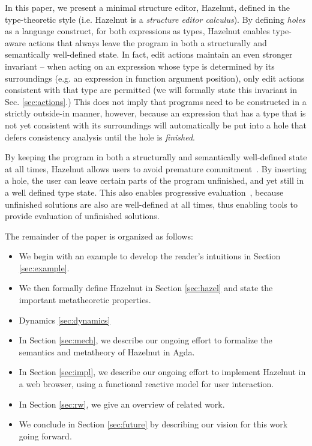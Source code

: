 In this paper, we present a minimal structure editor, Hazelnut,  defined in the type-theoretic style (i.e. Hazelnut is a \emph{structure editor calculus}). 
By defining \emph{holes} as a language construct, for both expressions as types, Hazelnut enables type-aware actions that always leave the program in both a structurally and semantically well-defined state. 
In fact, edit actions maintain an even stronger invariant -- when acting on an expression whose type is determined by its surroundings (e.g. an expression in function argument position), only edit actions consistent with that type are permitted (we will formally state this invariant in Sec. \ref{sec:actions}.) This does not imply that programs need to be constructed in a strictly outside-in manner, however, because an expression that has a type that is not yet consistent with its surroundings will automatically be put into a {hole} that defers consistency analysis until the hole is \emph{finished}.

By keeping the program in both a structurally and semantically well-defined state at all times, Hazelnut allows users to avoid premature commitment~\cite{green1996usability}.  
By inserting a hole, the user can leave certain parts of the program unfinished,  and yet still in a well defined type state. 
This also enables progressive evaluation~\cite{green1996usability}, because unfinished solutions are also are well-defined at all times, thus enabling tools to provide evaluation of unfinished solutions.
 




The remainder of the paper is organized as follows:
\begin{itemize}
  \item We begin with an example to develop the reader's intuitions in Section
    \ref{sec:example}.

  \item We then formally define Hazelnut in Section \ref{sec:hazel} and state the important metatheoretic properties.
  \item Dynamics \ref{sec:dynamics}

  \item In Section \ref{sec:mech}, we describe our ongoing effort to formalize the semantics and metatheory of Hazelnut in Agda.

  \item In Section \ref{sec:impl}, we describe our ongoing effort to implement Hazelnut in a web browser, using a functional reactive model for user interaction.
  \item In Section \ref{sec:rw}, we give an overview of related work.
  \item We conclude in Section \ref{sec:future} by describing our vision for this work going 
    forward.
\end{itemize}

